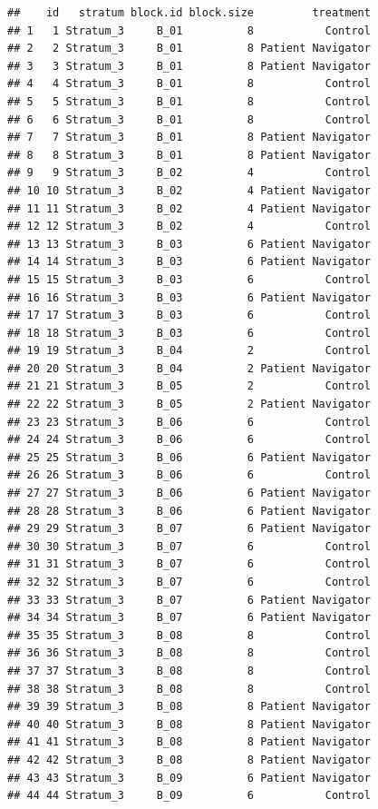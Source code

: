 \documentclass[
]{book}
\begin{document}
\begin{verbatim}
##    id   stratum block.id block.size         treatment
## 1   1 Stratum_3     B_01          8           Control
## 2   2 Stratum_3     B_01          8 Patient Navigator
## 3   3 Stratum_3     B_01          8 Patient Navigator
## 4   4 Stratum_3     B_01          8           Control
## 5   5 Stratum_3     B_01          8           Control
## 6   6 Stratum_3     B_01          8           Control
## 7   7 Stratum_3     B_01          8 Patient Navigator
## 8   8 Stratum_3     B_01          8 Patient Navigator
## 9   9 Stratum_3     B_02          4           Control
## 10 10 Stratum_3     B_02          4 Patient Navigator
## 11 11 Stratum_3     B_02          4 Patient Navigator
## 12 12 Stratum_3     B_02          4           Control
## 13 13 Stratum_3     B_03          6 Patient Navigator
## 14 14 Stratum_3     B_03          6 Patient Navigator
## 15 15 Stratum_3     B_03          6           Control
## 16 16 Stratum_3     B_03          6 Patient Navigator
## 17 17 Stratum_3     B_03          6           Control
## 18 18 Stratum_3     B_03          6           Control
## 19 19 Stratum_3     B_04          2           Control
## 20 20 Stratum_3     B_04          2 Patient Navigator
## 21 21 Stratum_3     B_05          2           Control
## 22 22 Stratum_3     B_05          2 Patient Navigator
## 23 23 Stratum_3     B_06          6           Control
## 24 24 Stratum_3     B_06          6           Control
## 25 25 Stratum_3     B_06          6 Patient Navigator
## 26 26 Stratum_3     B_06          6           Control
## 27 27 Stratum_3     B_06          6 Patient Navigator
## 28 28 Stratum_3     B_06          6 Patient Navigator
## 29 29 Stratum_3     B_07          6 Patient Navigator
## 30 30 Stratum_3     B_07          6           Control
## 31 31 Stratum_3     B_07          6           Control
## 32 32 Stratum_3     B_07          6           Control
## 33 33 Stratum_3     B_07          6 Patient Navigator
## 34 34 Stratum_3     B_07          6 Patient Navigator
## 35 35 Stratum_3     B_08          8           Control
## 36 36 Stratum_3     B_08          8           Control
## 37 37 Stratum_3     B_08          8           Control
## 38 38 Stratum_3     B_08          8           Control
## 39 39 Stratum_3     B_08          8 Patient Navigator
## 40 40 Stratum_3     B_08          8 Patient Navigator
## 41 41 Stratum_3     B_08          8 Patient Navigator
## 42 42 Stratum_3     B_08          8 Patient Navigator
## 43 43 Stratum_3     B_09          6 Patient Navigator
## 44 44 Stratum_3     B_09          6           Control

\end{verbatim}
\end{document}
